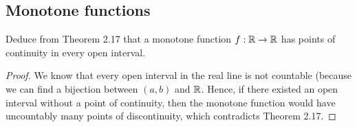\subsection{Monotone functions}


\begin{exercise}{32}
Deduce from Theorem 2.17 that a monotone function $f:\mathbb{R}\to\mathbb{R}$ has points of continuity in every open interval.
\end{exercise}
\begin{proof}
We know that every open interval in the real line is not countable (because we can find a bijection between $(a,b)$ and $\mathbb{R}$. Hence, if there existed an open interval without a point of continuity, then the monotone function would have uncountably many points of discontinuity, which contradicts Theorem 2.17.
\end{proof} 

